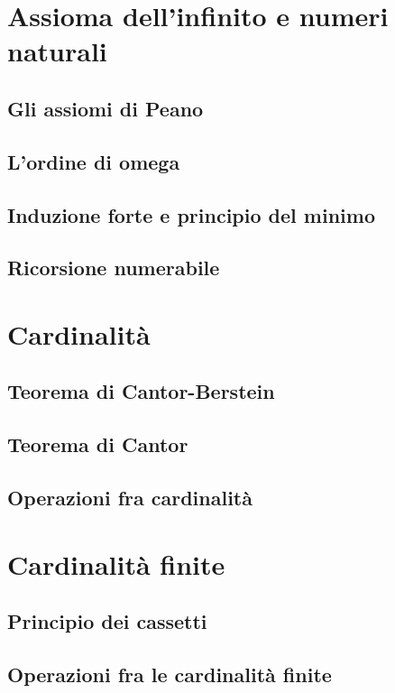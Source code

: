 \documentclass[11pt]{scrartcl}
\begin{document}
\newpage
\section{Assioma dell'infinito e numeri naturali}
\subsection{Gli assiomi di Peano}
\newpage
\subsection{L'ordine di omega}
\newpage
\subsection{Induzione forte e principio del minimo}
\newpage
\subsection{Ricorsione numerabile}




\newpage
\section{Cardinalità}
\subsection{Teorema di Cantor-Berstein}
\newpage
\subsection{Teorema di Cantor}
\newpage
\subsection{Operazioni fra cardinalità}





\newpage
\section{Cardinalità finite}
\subsection{Principio dei cassetti}
\newpage
\subsection{Operazioni fra le cardinalità finite}
\end{document}
